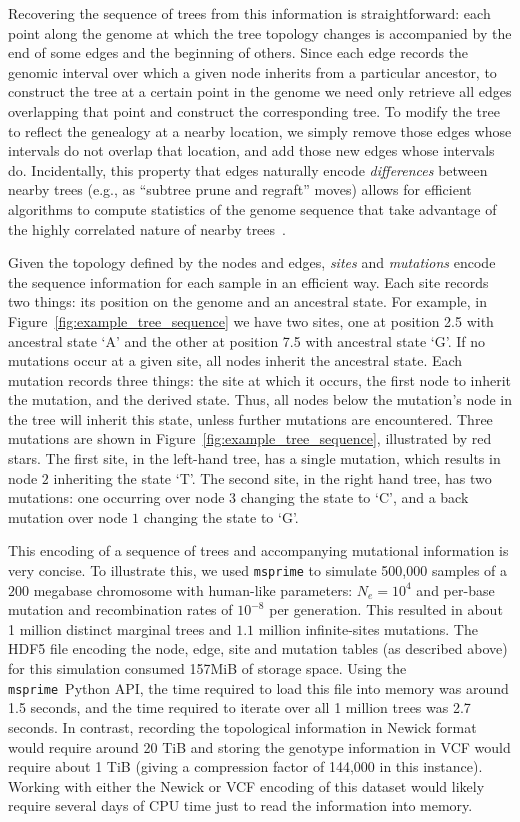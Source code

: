 \documentclass{article}
\newcommand{\msprime}{\texttt{msprime}}
\begin{document}
Recovering the sequence of trees from this information is straightforward:
each point along the genome at which the tree topology changes
is accompanied by the end of some {edges} and the beginning of others.
Since each {edge} records the genomic interval
over which a given node inherits from a particular ancestor,
to construct the tree at a certain point in the genome
we need only retrieve all edges overlapping that point
and construct the corresponding tree.
To modify the tree to reflect the genealogy at a nearby location,
we simply remove those edges whose intervals do not overlap that location,
and add those new edges whose intervals do.
Incidentally, this property that edges naturally encode \emph{differences}
between nearby trees (e.g., as ``subtree prune and regraft'' moves)
allows for efficient algorithms to compute statistics of the genome sequence that take advantage
of the highly correlated nature of nearby trees~\citep{kelleher2016efficient}.

Given the topology defined by the nodes and edges, \emph{sites} and \emph{mutations}
encode the sequence information for each sample in an efficient way. Each site
records two things: its position on the genome and an ancestral state.
For example,
in Figure~\ref{fig:example_tree_sequence} we have two sites, one at position
2.5 with ancestral state `A' and the other at position 7.5 with ancestral state `G'.
If no mutations occur at a given site, all nodes inherit the ancestral state.
Each mutation records three things: the site at which it occurs,
the first node to inherit the mutation, and the derived state.
Thus, all nodes below the mutation's node in the tree will inherit this state,
unless further mutations are encountered.
Three mutations are shown in Figure~\ref{fig:example_tree_sequence},
illustrated by red stars.
The first site, in the left-hand tree,
has a single mutation, which results in node $2$ inheriting the state `T'.
The second site, in the right hand tree, has two mutations:
one occurring over node $3$ changing the state to `C',
and a back mutation over node $1$ changing the state to `G'.

This encoding of a sequence of trees and accompanying mutational information is
very concise. To illustrate this, we used \msprime{} to simulate 500,000 samples of a
$200$ megabase chromosome with human-like parameters: $N_e=10^4$ and per-base mutation and
recombination rates of $10^{-8}$ per generation. This resulted
in about 1 million distinct marginal trees and $1.1$ million infinite-sites
mutations. The HDF5 file encoding the node, edge, site and mutation tables (as
described above) for this simulation consumed 157MiB of storage space. Using
the \msprime\ Python API, the time required to load this file into memory was
around 1.5 seconds, and the time required to iterate over all 1 million trees
was 2.7 seconds. In contrast, recording the topological information in Newick
format would require around 20 TiB and storing the genotype information
in VCF would require about 1 TiB (giving a compression factor of 144,000 in
this instance).
Working with either the Newick or VCF encoding
of this dataset would likely require several
days of CPU time just to read the information into memory.
\end{document}
